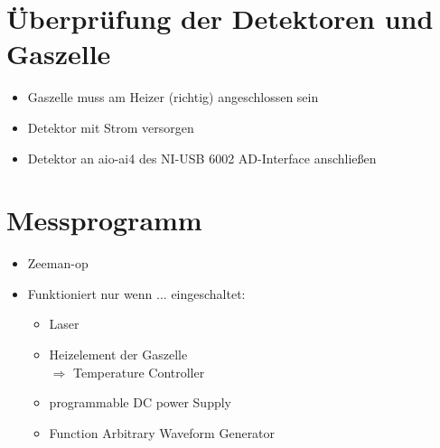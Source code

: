 \documentclass[a4paper, twoside]{article}
\begin{document}
\section{Überprüfung der Detektoren und Gaszelle}
\begin{itemize}
    \item Gaszelle muss am Heizer (richtig) angeschlossen sein
    \item Detektor mit Strom versorgen
    \item Detektor an aio-ai4 des NI-USB 6002 AD-Interface anschließen
\end{itemize}
\section{Messprogramm}
\begin{itemize}
    \item Zeeman-op
    \item Funktioniert nur wenn ... eingeschaltet:
    \begin{itemize}
        \item Laser
        \item Heizelement der Gaszelle\\ 
        $\Rightarrow$ Temperature Controller
        \item programmable DC power Supply
        \item Function Arbitrary Waveform Generator
    \end{itemize}
\end{itemize}
\end{document}
